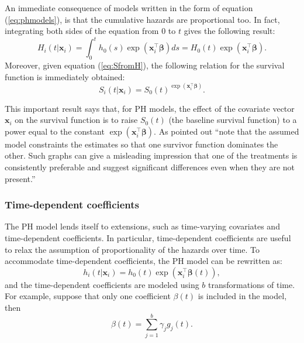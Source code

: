 An immediate consequence of models written in the form of equation (\ref{eq:phmodels}), is that the cumulative hazards are proportional too. In fact, integrating both sides of the equation from 0 to $t$ gives the following result:
\begin{equation}
H_i\left(t|\mathbf{x}_i\right) = \int_0^t h_0(s)\exp\left(\mathbf{x}_i^\top\boldsymbol{\beta}\right)ds = H_0(t)\exp\left(\mathbf{x}_i^\top\boldsymbol{\beta}\right).
\label{eq:phcumhazard}
\end{equation}
Moreover, given equation (\ref{eq:SfromH}), the following relation for the survival function is immediately obtained:
\begin{equation}
S_i(t|\mathbf{x}_i) = S_0(t)^{\exp\left(\mathbf{x}_i^\top\boldsymbol{\beta}\right)}.
\label{eq:phmodelssurv}
\end{equation}

This important result says that, for PH models, the effect of the covariate vector $\mathbf{x}_i$ on the survival function is to raise $S_0(t)$ (the baseline survival function) to a power equal to the constant $\exp\left(\mathbf{x}_i^\top\boldsymbol{\beta}\right)$. As \citet[pg.~118]{kalbfleisch_statistical_2002} pointed out ``note that the assumed model constraints the estimates so that one survivor function dominates the other. Such graphs can give a misleading impression that one of the treatments is consistently preferable and suggest significant differences even when they are not present.''


\subsubsection{Time-dependent coefficients}
The PH model lends itself to extensions, such as time-varying covariates and time-dependent coefficients. In particular, time-dependent coefficients are useful to relax the assumption of proportionality of the hazards over time. To accommodate time-dependent coefficients, the PH model can be rewritten as:
\begin{equation}
h_i(t|\mathbf{x}_i) = h_0(t)\exp \left(\mathbf{x}_i^\top\boldsymbol{\beta}(t)\right),
\label{eq:timedepph}
\end{equation}
and the time-dependent coefficients are modeled using $b$ transformations of time. For example, suppose that only one coefficient $\beta(t)$ is included in the model, then 
\begin{equation}
\beta(t) = \sum_{j=1}^b \gamma_j g_j(t).
\label{eq:timevcoef}
\end{equation}


